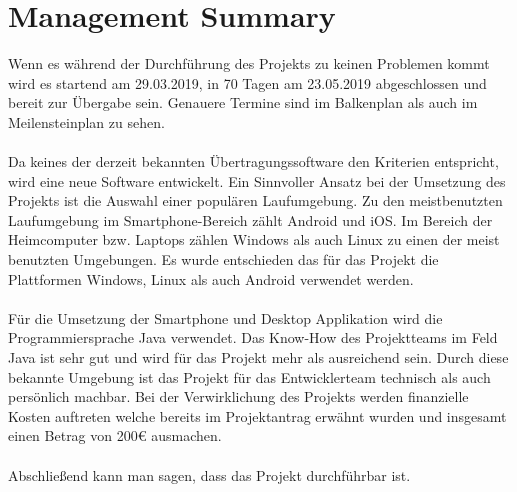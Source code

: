 \newpage
\section{Management Summary}
Wenn es während der Durchführung des Projekts zu keinen Problemen kommt wird es startend am 29.03.2019, in 70 Tagen am 23.05.2019 abgeschlossen und bereit zur Übergabe sein. Genauere Termine sind im Balkenplan als auch im Meilensteinplan zu sehen.
\\\\
Da keines der derzeit bekannten Übertragungssoftware den Kriterien entspricht, wird eine neue Software entwickelt. Ein Sinnvoller Ansatz bei der Umsetzung des Projekts ist die Auswahl einer populären Laufumgebung. Zu den meistbenutzten Laufumgebung im Smartphone-Bereich zählt Android und iOS. Im Bereich der Heimcomputer bzw. Laptops zählen Windows als auch Linux zu einen der meist benutzten Umgebungen. Es wurde entschieden das für das Projekt die Plattformen Windows, Linux als auch Android verwendet werden.
\\\\
Für die Umsetzung der Smartphone und Desktop Applikation wird die Programmiersprache Java verwendet. Das Know-How des Projektteams im Feld Java ist sehr gut und wird für das Projekt mehr als ausreichend sein. Durch diese bekannte Umgebung ist das Projekt für das Entwicklerteam technisch als auch persönlich machbar.
Bei der Verwirklichung des Projekts werden finanzielle Kosten auftreten welche bereits im Projektantrag erwähnt wurden und insgesamt einen Betrag von 200€ ausmachen.
\\\\
Abschließend kann man sagen, dass das Projekt durchführbar ist.